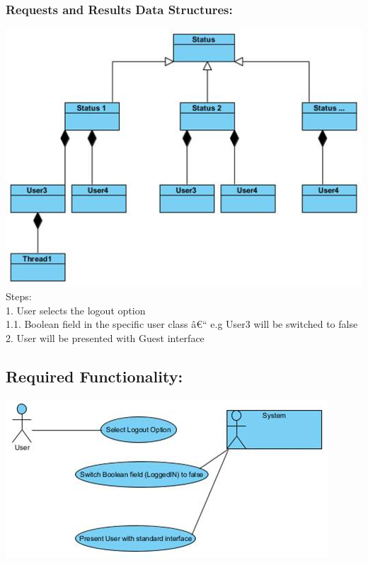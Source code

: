 \documentclass[a4paper,11pt]{article}
\begin{document}
\subsubsection*{Requests and Results Data Structures:}
\includegraphics[width=1\linewidth]{./Images/CRUDThread/Diagrams/17.jpg}\\
Steps:\\
1.	User selects the logout option\\
1.1.	Boolean field in the specific user class â€“ e.g User3 will be switched to false\\
2.	User will be presented with Guest interface\\
\subsection{Required Functionality:} 
\includegraphics[width=1\linewidth]{./Images/CRUDThread/Diagrams/18.jpg}\\
\end{document}
